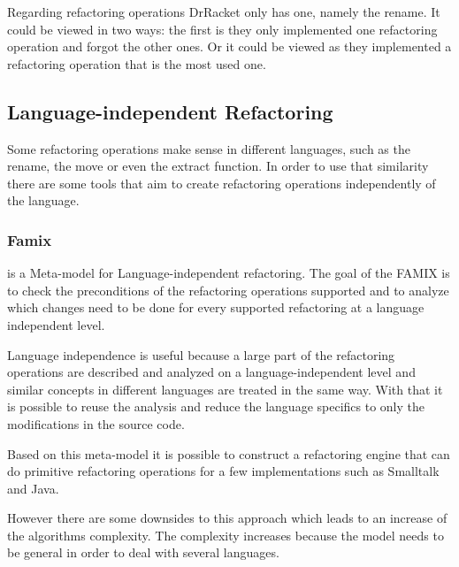 Regarding refactoring operations DrRacket only has one, namely the rename. 
It could be viewed in two ways: the first is they only implemented one refactoring operation and forgot the other ones.
Or it could be viewed as they implemented a refactoring operation that is the most used one. 






\subsection{Language-independent Refactoring} %
Some refactoring operations make sense in different languages, such as the rename, the move or even the extract function. In order to use that similarity there are some tools that aim to create refactoring operations independently of the language. 

\subsubsection{Famix}
\cite{tichelaar2000meta} is a  Meta-model for Language-independent refactoring.
The goal of the FAMIX is to check the preconditions of the refactoring operations supported and to analyze which changes need to be done for every supported refactoring at a language independent level.

Language independence is useful because a large part of the refactoring operations are described and analyzed on a language-independent level and similar concepts in different languages are treated in the same way. 
With that it is possible to reuse the analysis and reduce the language specifics to only the modifications in the source code.

Based on this meta-model it is possible to construct a refactoring engine that can do primitive refactoring operations for a few implementations such as Smalltalk and Java.

However there are some downsides to this approach which leads to an increase of the algorithms complexity. 
The complexity increases because the model needs to be general in order to deal with several languages. 


